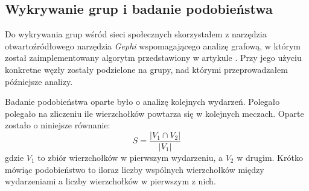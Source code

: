  \subsection{Wykrywanie grup i badanie podobieństwa}
 \label{section:koncepcja-wykrywaniegrup}
Do wykrywania grup wśród sieci społecznych skorzystałem z narzędzia
otwartoźródłowego narzędzia \textit{Gephi} wspomagającego analizę grafową, w
którym został zaimplementowany algorytm przedstawiony w artykule
\cite{blondel2008fuc}. Przy jego użyciu konkretne węzły zostały podzielone
na grupy, nad którymi przeprowadzałem późniejsze analizy.



Badanie podobieństwa oparte było o analizę kolejnych wydarzeń. 
Polegało polegało na zliczeniu ile wierzchołków powtarza się w kolejnych meczach.
Oparte zostało o niniejsze równanie:
\begin{equation}
S = \frac{|V_1 \cap V_2|}{|V_1|}
\end{equation}  
gdzie $V_1$ to zbiór wierzchołków w pierwszym wydarzeniu, a $V_2$ w drugim.
Krótko mówiąc podobieństwo to iloraz liczby wspólnych wierzchołków między 
wydarzeniami a liczby wierzchołków w pierwszym z nich.


